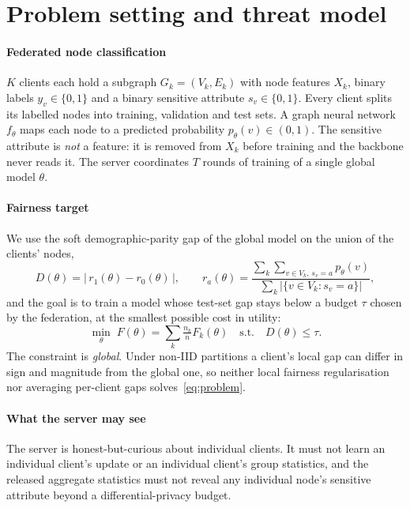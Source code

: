 \section{Problem setting and threat model}\label{sec:problem}

\paragraph{Federated node classification}
$K$ clients each hold a subgraph $G_k=(V_k,E_k)$ with node features $X_k$, binary labels $y_v\in\{0,1\}$ and a binary sensitive attribute $s_v\in\{0,1\}$. Every client splits its labelled nodes into training, validation and test sets. A graph neural network $f_\theta$ maps each node to a predicted probability $p_\theta(v)\in(0,1)$. The sensitive attribute is \emph{not} a feature: it is removed from $X_k$ before training and the backbone never reads it. The server coordinates $T$ rounds of training of a single global model $\theta$.

\paragraph{Fairness target}
We use the soft demographic-parity gap of the global model on the union of the clients' nodes,
\begin{equation}\label{eq:dpd}
D(\theta)=\bigl|\,r_1(\theta)-r_0(\theta)\,\bigr|,\qquad r_a(\theta)=\frac{\sum_k\sum_{v\in V_k,\,s_v=a}p_\theta(v)}{\sum_k|\{v\in V_k:s_v=a\}|},
\end{equation}
and the goal is to train a model whose test-set gap stays below a budget $\tau$ chosen by the federation, at the smallest possible cost in utility:
\begin{equation}\label{eq:problem}
\min_\theta\; F(\theta)=\sum_k \tfrac{n_k}{n}F_k(\theta)\quad\text{s.t.}\quad D(\theta)\le\tau .
\end{equation}
The constraint is \emph{global}. Under non-IID partitions a client's local gap can differ in sign and magnitude from the global one, so neither local fairness regularisation nor averaging per-client gaps solves~\eqref{eq:problem}.

\paragraph{What the server may see}
The server is honest-but-curious about individual clients. It must not learn an individual client's update or an individual client's group statistics, and the released aggregate statistics must not reveal any individual node's sensitive attribute beyond a differential-privacy budget.

